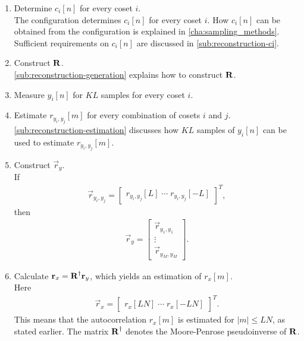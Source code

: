 \documentclass[a4paper, openany, oneside]{memoir}
\begin{document}
\begin{enumerate}[labelindent=0pt,labelwidth=\widthof{\ref{last-item1}},label=Step \arabic*:,itemindent=1em,leftmargin=!]
    \item Determine $c_i[n]$ for every coset $i$. \\
    The configuration determines $c_i[n]$ for every coset $i$. How $c_i[n]$ can be obtained from the configuration is explained in \cref{cha:sampling_methods}. Sufficient requirements on $c_i[n]$ are discussed in \cref{sub:reconstruction-ci}.
    \item Construct $\boldsymbol{\mathbf{R}}$. \\
    \cref{sub:reconstruction-generation} explains how to construct $\boldsymbol{\mathbf{R}}$.
    \item Measure $y_i[n]$ for $KL$ samples for every coset $i$.
    \item Estimate $r_{y_i,y_j}[m]$ for every combination of cosets $i$ and $j$. \\
    \cref{sub:reconstruction-estimation} discusses how $KL$ samples of $y_i[n]$ can be used to estimate $r_{y_i,y_j}[m]$.
    \item Construct $\vec{r}_y$. \\
    If
    \begin{align*}
        \vec{r}_{y_i,y_j} = \begin{bmatrix}
            r_{y_i,y_j}[L] \; \cdots \; r_{y_i,y_j}[-L]
        \end{bmatrix}^T,
    \end{align*}
    then
    \begin{align*}
        \vec{r}_y = \begin{bmatrix}
            \vec{r}_{y_1,y_1} \\ \vdots \\ \vec{r}_{y_M,y_M}
        \end{bmatrix}.
    \end{align*}
    \item Calculate $\boldsymbol{\mathbf{r}}_x=\boldsymbol{\mathbf{R}}^\dagger \boldsymbol{\mathbf{r}}_y$, which yields an estimation of $r_x[m]$. \\
    Here
    \begin{align*}
         \vec{r}_x = \begin{bmatrix}
             r_x[LN] \; \cdots \; r_x[-LN]
         \end{bmatrix}^T.
    \end{align*} This means that the autocorrelation $r_x[m]$ is estimated for $|m| \le LN$, as stated earlier. The matrix $\boldsymbol{\mathbf{R}}^\dagger$ denotes the Moore-Penrose pseudoinverse of $\boldsymbol{\mathbf{R}}$.
    \label{last-item1}
\end{enumerate}
\end{document}
